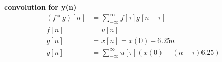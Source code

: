 \documentclass[journal,12pt,twocolumn]{IEEEtran}
\theoremstyle{remark}
\begin{document}
\textbf{{convolution for y(n)}}
\begin{align}
(f*g)[n]&=\sum_{-\infty}^{\infty}{f[\tau]g[n-\tau]}
\\f[n]&=u[n]
\\g[n]&=x[n]=x(0)+6.25n
\\y[n]&=\sum_{-\infty}^{\infty}{u[\tau](x(0)+(n-\tau)6.25)}
\end{align}
 
\end{document}
